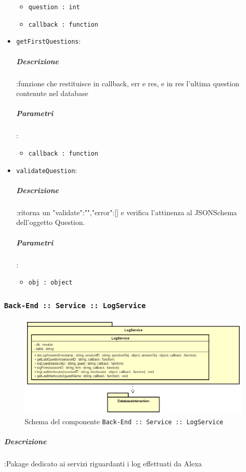 \documentclass[../DefinizioneDiProdotto_v2.0.0.tex]{subfiles}
\begin{document}
\begin{itemize}
\begin{itemize}
	\item \texttt{question : int}
	\item \texttt{callback : function}
\end{itemize}
\item \texttt{getFirstQuestions}:
\subparagraph{Descrizione}:funzione che restituisce in callback, err e res, e in res l'ultima question contenute nel database
\subparagraph{Parametri}:
\begin{itemize}
	\item \texttt{callback : function}
\end{itemize}
\item \texttt{validateQuestion}:
\subparagraph{Descrizione}:ritorna un {"validate":"","error":[]}  e verifica l'attinenza al JSONSchema dell'oggetto Question.
\subparagraph{Parametri}:
\begin{itemize}
	\item \texttt{obj : object}
\end{itemize}
\end{itemize}
\newpage
\subsubsection{\texttt{Back-End :: Service :: LogService}}
\begin{figure}[!h]
	\centering
	\includegraphics[scale=0.6]{Architettura/Back-End/Service/LogService.png}
	\caption{Schema del componente \texttt{Back-End :: Service :: LogService}}
\end{figure}

\subparagraph{Descrizione}:Pakage dedicato ai servizi riguardanti i log effettuati da Alexa
\end{document}
